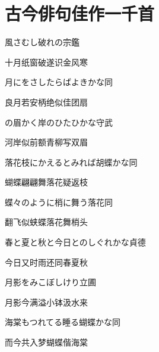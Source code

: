
\newpage

\chapter{\FK 古今俳句佳作一千首}

\setcounter{haikucounter}{0}

\begin{haiku}
    {\FH 風さむし破れの}\hfill{\FH 宗鑑}

    {\FK 十月纸窗破遂识金风寒}
\end{haiku}

\begin{haiku}
    {\FH 月にをさしたらばよきかな}\hfill{\FH 同}

    {\FK 良月若安柄绝似佳团扇}
\end{haiku}

\begin{haiku}
    {\FH {}の眉かく岸のひたひかな}\hfill{\FH 守武}

    {\FK 河岸似前额青柳写双眉}
\end{haiku}

\begin{haiku}
    {\FH 落花枝にかえるとみれば胡蝶かな}\hfill{\FH 同}

    {\FK 蝴蝶翩翩舞落花疑返枝}
\end{haiku}

\begin{haiku}
    {\FH 蝶々のように梢に舞う落花}\hfill{\FH 同}

    {\FK 翻飞似蛱蝶落花舞梢头}
\end{haiku}

\begin{haiku}
    {\FH 春と夏と秋と今日とのしぐれかな}\hfill{\FH 貞德}

    {\FK 今日又时雨还同春夏秋}
\end{haiku}

\begin{haiku}
    {\FH 月影をみこぼしけり}\hfill{\FH 立圃}

    {\FK 月影今满溢小钵汲水来}
\end{haiku}

\begin{haiku}
    {\FH 海棠もつれてる睡る蝴蝶かな}\hfill{\FH 同}

    {\FK 而今共入梦蝴蝶偕海棠}
\end{haiku}

